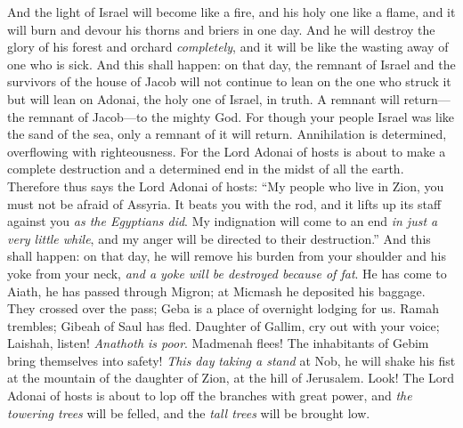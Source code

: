 \begin{biblechapter}
\verse And the light of Israel will become like a fire, 
and his holy one like a flame, 
and it will burn and devour his thorns and briers in one day.
\verse And he will destroy the glory of his forest and orchard \textit{completely}, 
and it will be like the wasting away of one who is sick.
 And this shall happen: on that day, the remnant of Israel and the survivors of the house of Jacob will not continue to lean on the one who struck it 
but will lean on Adonai, the holy one of Israel, in truth.
\verse A remnant will return— 
the remnant of Jacob—to the mighty God.
\verse For though your people Israel was like the sand of the sea, 
only a remnant of it will return. 
Annihilation is determined, 
overflowing with righteousness.
\verse For the Lord Adonai of hosts is about to make a complete destruction 
and a determined end in the midst of all the earth.
\verse Therefore thus says the Lord Adonai of hosts:
\verse “My people who live in Zion, 
you must not be afraid of Assyria. 
It beats you with the rod, 
and it lifts up its staff against you \textit{as the Egyptians did}.
\verse My indignation will come to an end \textit{in just a very little while}, 
and my anger will be directed to their destruction.”
\verse And this shall happen: on that day,
\verse he will remove his burden from your shoulder 
and his yoke from your neck, 
\textit{and a yoke will be destroyed because of fat}.
\verse He has come to Aiath, 
he has passed through Migron; 
at Micmash he deposited his baggage.
\verse They crossed over the pass; 
Geba is a place of overnight lodging for us. 
Ramah trembles; 
Gibeah of Saul has fled.
\verse Daughter of Gallim, cry out with your voice; 
Laishah, listen! 
\textit{Anathoth is poor}.
\verse Madmenah flees! 
The inhabitants of Gebim bring themselves into safety!
\verse \textit{This day} \textit{taking a stand} at Nob, 
he will shake his fist at the mountain of the daughter of Zion, 
at the hill of Jerusalem.
\verse Look! The Lord Adonai of hosts is about to lop off the branches with great power, 
and \textit{the towering trees} will be felled, 
and the \textit{tall trees} will be brought low.
\end{biblechapter}

